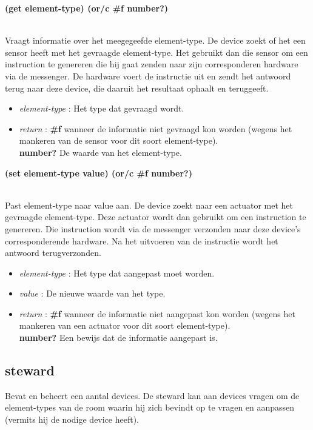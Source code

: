 \documentclass{article}
\newcommand{\ar}{\ding{213} }
\newcommand{\code}[1]{\textcolor{code}{#1}}
\newcommand{\lb}[1][]{\code{(#1}}
\newcommand{\rb}{\code{)}}
\newcommand{\racket}[1]{
	{\color{blue}\textbf{#1}}
}
\begin{document}
\begin{framed}
\hypertarget{device:get}{\racket{\lb[get] element-type\rb \ar \lb[or/c] \#f number?\rb}}
\\Vraagt informatie over het meegegeefde element-type. De device zoekt of het een sensor heeft met het gevraagde element-type. Het gebruikt dan die sensor om een instruction te genereren die hij gaat zenden naar zijn corresponderen hardware via de messenger. De hardware voert de instructie uit en zendt het antwoord terug naar deze device, die daaruit het resultaat ophaalt en teruggeeft.
\begin{itemize}
	\item \emph{element-type} : Het type dat gevraagd wordt.
	\item \emph{return} : \racket{\#f} wanneer de informatie niet gevraagd kon worden (wegens het mankeren van de sensor voor dit soort element-type).\\\racket{number?} De waarde van het element-type.
\end{itemize}
\end{framed}

\begin{framed}
\hypertarget{device:set}{\racket{\lb[set] element-type value\rb \ar \lb[or/c] \#f number?\rb}}
\\Past element-type naar value aan. De device zoekt naar een actuator met het gevraagde element-type. Deze actuator wordt dan gebruikt om een instruction te genereren. Die instruction wordt via de messenger verzonden naar deze device's corresponderende hardware. Na het uitvoeren van de instructie wordt het antwoord terugverzonden.
\begin{itemize}
	\item \emph{element-type} : Het type dat aangepast moet worden.
	\item \emph{value} : De nieuwe waarde van het type.
	\item \emph{return} : \racket{\#f} wanneer de informatie niet aangepast kon worden (wegens het mankeren van een actuator voor dit soort element-type).\\\racket{number?} Een bewijs dat de informatie aangepast is.
\end{itemize}
\end{framed}

\newpage
\hypertarget{steward}{\subsection{steward}}
Bevat en beheert een aantal devices. De steward kan aan devices vragen om de element-types van de room waarin hij zich bevindt op te vragen en aanpassen (vermits hij de nodige device heeft).
\end{document}
